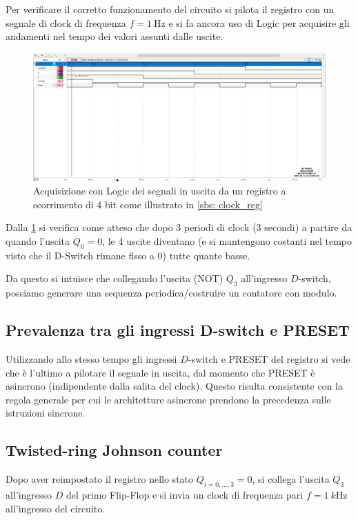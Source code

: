 \documentclass[10pt, a4paper, italian]{article}
\begin{document}
Per verificare il corretto funzionamento del circuito si pilota il registro
con un segnale di clock di frequenza $f = \SI{1}{\Hz}$ e si fa ancora uso di
Logic per acquisire gli andamenti nel tempo dei valori assunti dalle uscite.
\begin{figure}[htbp]
\centering
	\includegraphics[width=\textwidth]{3.c}
	\caption{Acquisizione con Logic dei segnali in uscita da un registro a
	scorrimento di 4 bit come illustrato in \cref{sbs: clock_reg}
	\label{fig: Shift_reg_clock}}
\end{figure}
Dalla \cref{fig: Shift_reg_clock} si verifica come atteso che dopo 3 periodi
di clock (3 secondi) a partire da quando l'uscita $Q_0 = 0$, le 4 uscite
diventano (e si mantengono costanti nel tempo visto che il D-Switch rimane
fisso a 0) tutte quante basse.

Da questo si intuisce che collegando l'uscita (NOT) $Q_3$ all'ingresso
$D$-switch, possiamo generare una sequenza periodica/costruire un contatore
con modulo.

\subsection{Prevalenza tra gli ingressi D-switch e PRESET}
Utilizzando allo stesso tempo gli ingressi $D$-switch e PRESET del registro
si vede che è l'ultimo a pilotare il segnale in uscita, dal momento che PRESET
è asincrono (indipendente dalla salita del clock). Questo risulta consistente
con la regola generale per cui le architetture asincrone prendono la precedenza
sulle istruzioni sincrone. 

\subsection{Twisted-ring Johnson counter}
Dopo aver reimpostato il registro nello stato $Q_{i=0,\ldots, 3} = 0$, si
collega l'uscita $\overline{Q_3}$ all'ingresso $D$ del primo Flip-Flop e si
invia un clock di frequenza pari $f = \SI{1}{k\Hz}$ all'ingresso del circuito.
\end{document}
